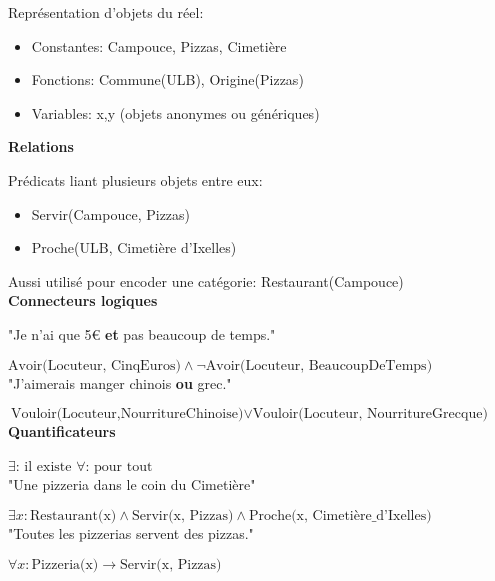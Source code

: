 Représentation d'objets du réel:

\begin{itemize}
    \item Constantes: Campouce, Pizzas, Cimetière
    \item Fonctions: Commune(ULB), Origine(Pizzas)
    \item Variables: x,y (objets anonymes ou génériques)\\
\end{itemize}

\textbf{Relations}

Prédicats liant plusieurs objets entre eux:

\begin{itemize}
    \item Servir(Campouce, Pizzas)
    \item Proche(ULB, Cimetière d'Ixelles)\\
\end{itemize}

Aussi utilisé pour encoder une catégorie: Restaurant(Campouce)\\

\textbf{Connecteurs logiques}

"Je n'ai que 5€ \textbf{et} pas beaucoup de temps."

$ \text{Avoir(Locuteur, CinqEuros)} \land \neg \text{Avoir(Locuteur, BeaucoupDeTemps)}$ \\

"J'aimerais manger chinois \textbf{ou} grec."

$ \text{Vouloir(Locuteur,NourritureChinoise)} \lor \text{Vouloir(Locuteur, NourritureGrecque)}$ \\

\textbf{Quantificateurs}

\hspace{2cm} $\exists \text{: il existe}$ \hspace{2cm} $\forall \text{: pour tout}$\\

"Une pizzeria dans le coin du Cimetière"

$\exists x: \text{Restaurant(x)} \land \text{Servir(x, Pizzas)} \land \text{Proche(x, Cimetière\_d'Ixelles)}$\\

"Toutes les pizzerias servent des pizzas."

$ \forall x: \text{Pizzeria(x)} \rightarrow \text{Servir(x, Pizzas)} $ \\

